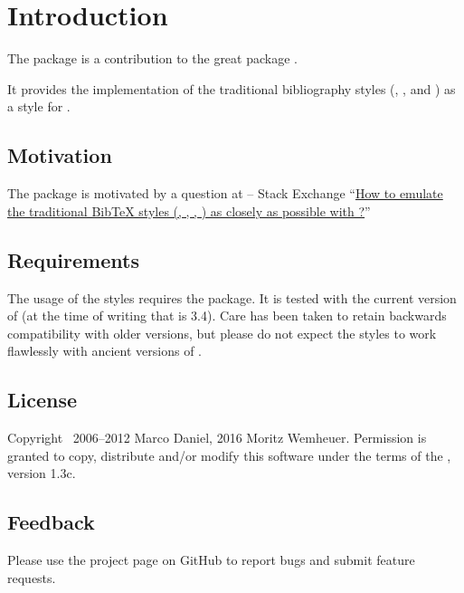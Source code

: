\documentclass{ltxdockit}[2011/03/25]
\begin{document}
\printtitlepage
\tableofcontents


\section{Introduction}\label{sec:int}

The package  is a contribution to the great package .

It provides the implementation of the traditional bibliography styles (,
,  and ) as a style for .

\subsection{Motivation}\label{subsec:int:mot}

The package is motivated by a question at \tex{} -- \latex Stack Exchange \enquote{\href{http://tex.stackexchange.com/a/69706/}{How to emulate the traditional BibTeX styles (, , , ) as closely as possible with ?}}

\subsection{Requirements}
The usage of the styles requires the  package.
It is tested with the current version of  (at the time of writing that is 3.4).
Care has been taken to retain backwards compatibility with older versions,
but please do not expect the styles to work flawlessly with ancient versions of .

\subsection{License}

Copyright \textcopyright\ 2006--2012 Marco Daniel, 2016 Moritz Wemheuer. Permission is granted to copy, distribute and\slash or modify this software under the terms of the \lppl, version 1.3c.


\subsection{Feedback}\label{subsec:int:feb}

Please use the  project page on GitHub to report bugs and submit feature requests.
\end{document}
